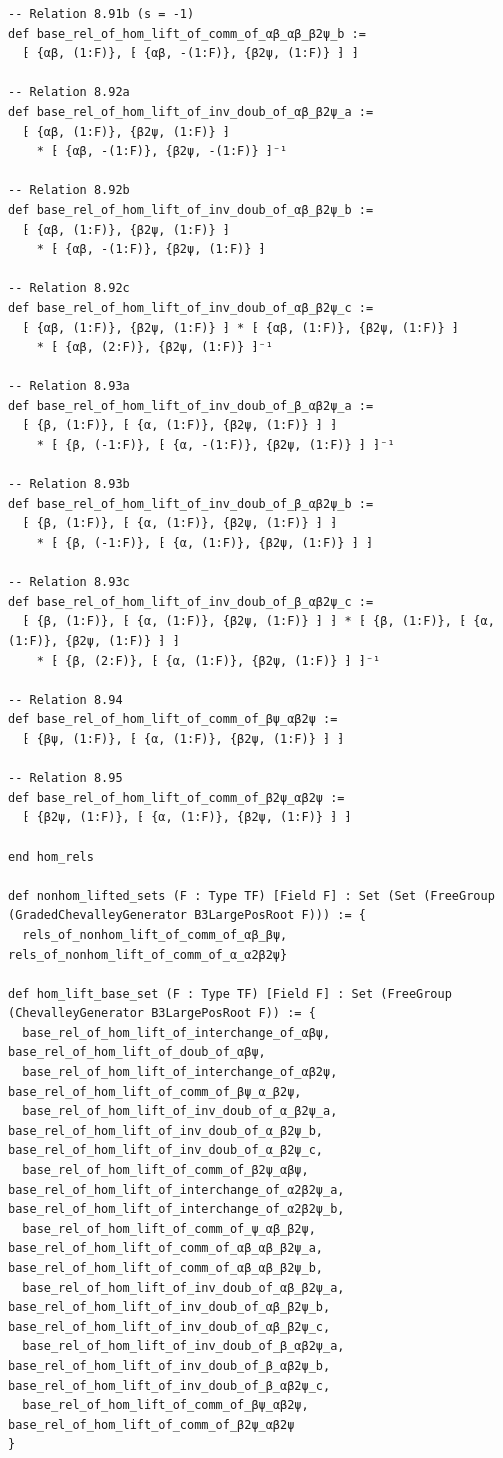 \begin{Verbatim}
-- Relation 8.91b (s = -1)
def base_rel_of_hom_lift_of_comm_of_αβ_αβ_β2ψ_b :=
  ⁅ {αβ, (1:F)}, ⁅ {αβ, -(1:F)}, {β2ψ, (1:F)} ⁆ ⁆

-- Relation 8.92a
def base_rel_of_hom_lift_of_inv_doub_of_αβ_β2ψ_a :=
  ⁅ {αβ, (1:F)}, {β2ψ, (1:F)} ⁆
    * ⁅ {αβ, -(1:F)}, {β2ψ, -(1:F)} ⁆⁻¹

-- Relation 8.92b
def base_rel_of_hom_lift_of_inv_doub_of_αβ_β2ψ_b :=
  ⁅ {αβ, (1:F)}, {β2ψ, (1:F)} ⁆
    * ⁅ {αβ, -(1:F)}, {β2ψ, (1:F)} ⁆

-- Relation 8.92c
def base_rel_of_hom_lift_of_inv_doub_of_αβ_β2ψ_c :=
  ⁅ {αβ, (1:F)}, {β2ψ, (1:F)} ⁆ * ⁅ {αβ, (1:F)}, {β2ψ, (1:F)} ⁆
    * ⁅ {αβ, (2:F)}, {β2ψ, (1:F)} ⁆⁻¹

-- Relation 8.93a
def base_rel_of_hom_lift_of_inv_doub_of_β_αβ2ψ_a :=
  ⁅ {β, (1:F)}, ⁅ {α, (1:F)}, {β2ψ, (1:F)} ⁆ ⁆
    * ⁅ {β, (-1:F)}, ⁅ {α, -(1:F)}, {β2ψ, (1:F)} ⁆ ⁆⁻¹

-- Relation 8.93b
def base_rel_of_hom_lift_of_inv_doub_of_β_αβ2ψ_b :=
  ⁅ {β, (1:F)}, ⁅ {α, (1:F)}, {β2ψ, (1:F)} ⁆ ⁆
    * ⁅ {β, (-1:F)}, ⁅ {α, (1:F)}, {β2ψ, (1:F)} ⁆ ⁆

-- Relation 8.93c
def base_rel_of_hom_lift_of_inv_doub_of_β_αβ2ψ_c :=
  ⁅ {β, (1:F)}, ⁅ {α, (1:F)}, {β2ψ, (1:F)} ⁆ ⁆ * ⁅ {β, (1:F)}, ⁅ {α, (1:F)}, {β2ψ, (1:F)} ⁆ ⁆
    * ⁅ {β, (2:F)}, ⁅ {α, (1:F)}, {β2ψ, (1:F)} ⁆ ⁆⁻¹

-- Relation 8.94
def base_rel_of_hom_lift_of_comm_of_βψ_αβ2ψ :=
  ⁅ {βψ, (1:F)}, ⁅ {α, (1:F)}, {β2ψ, (1:F)} ⁆ ⁆

-- Relation 8.95
def base_rel_of_hom_lift_of_comm_of_β2ψ_αβ2ψ :=
  ⁅ {β2ψ, (1:F)}, ⁅ {α, (1:F)}, {β2ψ, (1:F)} ⁆ ⁆

end hom_rels

def nonhom_lifted_sets (F : Type TF) [Field F] : Set (Set (FreeGroup (GradedChevalleyGenerator B3LargePosRoot F))) := {
  rels_of_nonhom_lift_of_comm_of_αβ_βψ, rels_of_nonhom_lift_of_comm_of_α_α2β2ψ}

def hom_lift_base_set (F : Type TF) [Field F] : Set (FreeGroup (ChevalleyGenerator B3LargePosRoot F)) := {
  base_rel_of_hom_lift_of_interchange_of_αβψ, base_rel_of_hom_lift_of_doub_of_αβψ,
  base_rel_of_hom_lift_of_interchange_of_αβ2ψ, base_rel_of_hom_lift_of_comm_of_βψ_α_β2ψ,
  base_rel_of_hom_lift_of_inv_doub_of_α_β2ψ_a, base_rel_of_hom_lift_of_inv_doub_of_α_β2ψ_b, base_rel_of_hom_lift_of_inv_doub_of_α_β2ψ_c,
  base_rel_of_hom_lift_of_comm_of_β2ψ_αβψ, base_rel_of_hom_lift_of_interchange_of_α2β2ψ_a, base_rel_of_hom_lift_of_interchange_of_α2β2ψ_b,
  base_rel_of_hom_lift_of_comm_of_ψ_αβ_β2ψ, base_rel_of_hom_lift_of_comm_of_αβ_αβ_β2ψ_a, base_rel_of_hom_lift_of_comm_of_αβ_αβ_β2ψ_b,
  base_rel_of_hom_lift_of_inv_doub_of_αβ_β2ψ_a, base_rel_of_hom_lift_of_inv_doub_of_αβ_β2ψ_b, base_rel_of_hom_lift_of_inv_doub_of_αβ_β2ψ_c,
  base_rel_of_hom_lift_of_inv_doub_of_β_αβ2ψ_a, base_rel_of_hom_lift_of_inv_doub_of_β_αβ2ψ_b, base_rel_of_hom_lift_of_inv_doub_of_β_αβ2ψ_c,
  base_rel_of_hom_lift_of_comm_of_βψ_αβ2ψ, base_rel_of_hom_lift_of_comm_of_β2ψ_αβ2ψ
}


\end{Verbatim}
